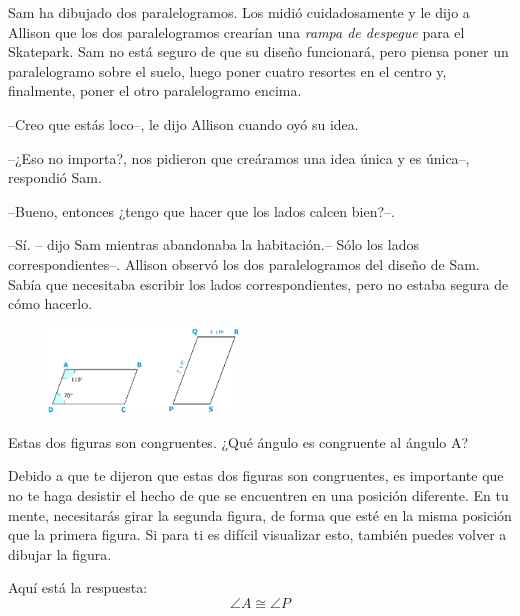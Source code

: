 \begin{myquestion}[10]
    Sam ha dibujado dos paralelogramos. Los midió cuidadosamente y le dijo a Allison que los dos paralelogramos crearían una \emph{rampa de despegue} para el Skatepark. Sam no está seguro de que su diseño funcionará, pero piensa poner un paralelogramo sobre el suelo, luego poner cuatro resortes en el centro y, finalmente, poner el otro paralelogramo encima.

    --Creo que estás loco--, le dijo Allison cuando oyó su idea.

    --¿Eso no importa?, nos pidieron que creáramos una idea única y es única--, respondió Sam.

    --Bueno, entonces ¿tengo que hacer que los lados calcen bien?--.

    --Sí. -- dijo Sam mientras abandonaba la habitación.-- Sólo los lados correspondientes--.
    Allison observó los dos paralelogramos del diseño de Sam. Sabía que necesitaba escribir los lados correspondientes, pero no estaba segura de cómo hacerlo.


    \begin{figure}[H]
        \centering
        \includegraphics[width=0.45\textwidth]{../images/congruencia01.png}
        \caption{}
        \label{fig:congruencia01}
    \end{figure}

    Estas dos figuras son congruentes. ¿Qué ángulo es congruente al ángulo A?

    \begin{solutionbox}{6cm}
        Debido a que te dijeron que estas dos figuras son congruentes, es importante que no te haga desistir el hecho de que se encuentren en una posición diferente. En tu mente, necesitarás girar la segunda figura, de forma que esté en la misma posición que la primera figura. Si para ti es difícil visualizar esto, también puedes volver a dibujar la figura.

        Aquí está la respuesta:
        \[\angle A \cong \angle P\]
    \end{solutionbox}
\end{myquestion}